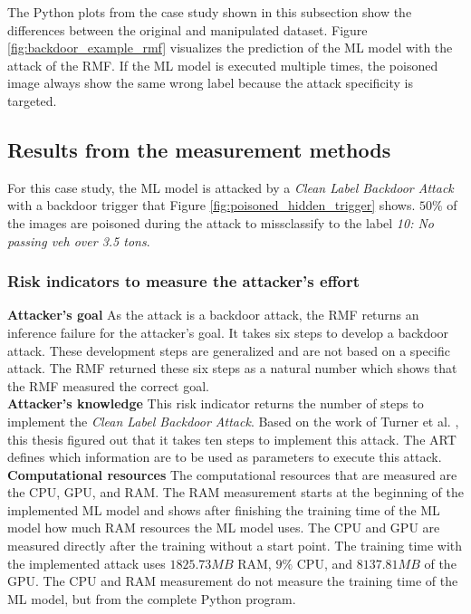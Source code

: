 The Python plots from the case study shown in this subsection show the differences between the original and manipulated dataset. Figure \ref{fig:backdoor_example_rmf} visualizes the prediction of the ML model with the attack of the RMF. If the ML model is executed multiple times, the poisoned image always show the same wrong label because the attack specificity is targeted.

\subsection{Results from the measurement methods}

For this case study, the ML model is attacked by a \textit{Clean Label Backdoor Attack} with a backdoor trigger that Figure \ref{fig:poisoned_hidden_trigger} shows. $50\%$ of the images are poisoned during the attack to missclassify to the label \textit{10: No passing veh over 3.5 tons}.

\subsubsection*{Risk indicators to measure the attacker's effort}

\noindent\textbf{Attacker's goal} As the attack is a backdoor attack, the RMF returns an inference failure for the attacker's goal. It takes six steps to develop a backdoor attack. These development steps are generalized and are not based on a specific attack. The RMF returned these six steps as a natural number which shows that the RMF measured the correct goal. \\

\noindent\textbf{Attacker's knowledge} This risk indicator returns the number of steps to implement the \textit{Clean Label Backdoor Attack}. Based on the work of Turner et al. \cite{turner2018clean}, this thesis figured out that it takes ten steps to implement this attack. The ART \cite{art2018} defines which information are to be used as parameters to execute this attack. \\

\noindent\textbf{Computational resources} The computational resources that are measured are the CPU, GPU, and RAM. The RAM measurement starts at the beginning of the implemented ML model and shows after finishing the training time of the ML model how much RAM resources the ML model uses. The CPU and GPU are measured directly after the training without a start point. The training time with the implemented attack uses $1825.73MB$ RAM, $9\%$ CPU, and $8137.81MB$ of the GPU. The CPU and RAM measurement do not measure the training time of the ML model, but from the complete Python program. \\

